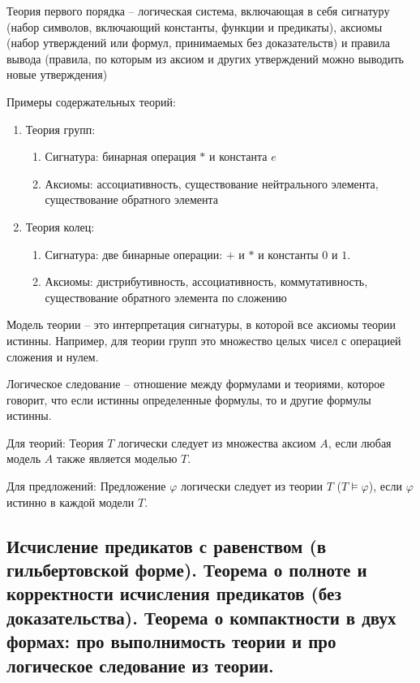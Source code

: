 \documentclass[a4paper, 10pt]{article}
\begin{document}
Теория первого порядка -- логическая система, включающая в себя сигнатуру (набор символов, включающий константы, функции и предикаты), аксиомы (набор утверждений или формул, принимаемых без доказательств) и правила вывода (правила, по которым из аксиом и других утверждений можно выводить новые утверждения)

\hfill

Примеры содержательных теорий:

\begin{enumerate}
    \item Теория групп:
    \begin{enumerate}
        \item Сигнатура: бинарная операция $*$ и константа $e$
        \item Аксиомы: ассоциативность, существование нейтрального элемента, существование обратного элемента
    \end{enumerate}
    \item Теория колец:
    \begin{enumerate}
        \item Сигнатура: две бинарные операции: $+$ и $*$ и константы $0$ и $1$.
        \item Аксиомы: дистрибутивность, ассоциативность, коммутативность, существование обратного элемента по сложению
    \end{enumerate}
\end{enumerate}

Модель теории -- это интерпретация сигнатуры, в которой все аксиомы теории истинны. Например, для теории групп это множество целых чисел с операцией сложения и нулем.

\hfill

Логическое следование -- отношение между формулами и теориями, которое говорит, что если истинны определенные формулы, то и другие формулы истинны.

Для теорий: Теория $T$ логически следует из множества аксиом $A$, если любая модель $A$ также является моделью $T$.

Для предложений: Предложение $\varphi$ логически следует из теории $T$ ($T\models\varphi$), если $\varphi$ истинно в каждой модели $T$.

\subsection{Исчисление предикатов с равенством (в гильбертовской форме). Теорема о полноте и корректности исчисления предикатов (без доказательства). Теорема о компактности в двух формах: про выполнимость теории и про логическое следование из теории.}
\end{document}
